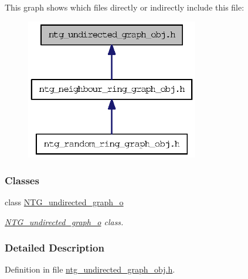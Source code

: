 This graph shows which files directly or indirectly include this file:
\nopagebreak
\begin{figure}[H]
\begin{center}
\leavevmode
\includegraphics[width=214pt]{ntg__undirected__graph__obj_8h__dep__incl}
\end{center}
\end{figure}
\subsubsection*{Classes}
\begin{DoxyCompactItemize}
\item 
class \hyperlink{class_n_t_g__undirected__graph__o}{NTG\_\-undirected\_\-graph\_\-o}
\begin{DoxyCompactList}\small\item\em \hyperlink{class_n_t_g__undirected__graph__o}{NTG\_\-undirected\_\-graph\_\-o} class. \item\end{DoxyCompactList}\end{DoxyCompactItemize}


\subsubsection{Detailed Description}


Definition in file \hyperlink{ntg__undirected__graph__obj_8h_source}{ntg\_\-undirected\_\-graph\_\-obj.h}.

